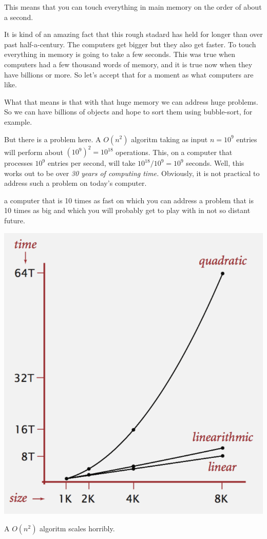 \documentclass{tufte-handout}
\begin{document}
\bigskip
This means that you can touch everything in main memory on the order of about a second.

\bigskip
It is kind of an amazing fact that this rough stadard has held for longer than over past half-a-century. The 
computers get bigger but they also get faster. To touch everything in memory is going to take a few seconds.
This was true when computers had a few thousand words of memory, and it is true now when they have billions
or more. So let's accept that for a moment as what computers are like.

\bigskip
What that means is that with that huge memory we can address huge problems. So we can have billions of 
objects and hope to sort them using bubble-sort, for example. 

\bigskip
But there is a problem here. A $O(n^2)$ algoritm taking as input $n = 10^9$  entries will perform about 
$(10^9)^2 = 10^{18}$  operations. This, on a computer that processes $10^9$ entries per second, will 
take $10^{18} / 10^9 = 10^9$ seconds.  Well, this works out to be over \emph{30 years of computing time.} 
Obviously, it is not practical to address such a problem on today's computer.  

 a computer that is 10 times as fast on which you can address a problem that is 10 times as big and 
which you will probably get to play with in not so distant future. 

\begin{marginfigure}
  \includegraphics{graph}
  \caption{A $O(n^2)$ algoritm scales horribly.}
\end{marginfigure}
\end{document}
